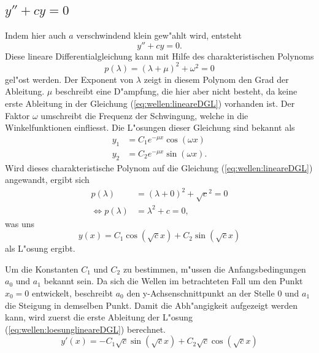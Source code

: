 \subsection{\texorpdfstring{$y''+cy = 0$}{y''+cy = 0}}
Indem hier auch $a$ verschwindend klein gew"ahlt wird, entsteht
\begin{equation}
	y''+ cy = 0.
	\label{eq:wellen:lineareDGL}
\end{equation}
Diese lineare Differentialgleichung kann mit Hilfe des charakteristischen 
Polynoms
\begin{equation*}
	p(\lambda) = (\lambda+\mu)^2+\omega^2 = 0
\end{equation*}
gel"ost werden. Der Exponent von $\lambda$ zeigt in diesem Polynom den Grad der 
Ableitung. $\mu$ beschreibt eine D"ampfung, die hier aber nicht besteht, da 
keine erste Ableitung in der Gleichung (\ref{eq:wellen:lineareDGL}) vorhanden 
ist. Der Faktor $\omega$ umschreibt die Frequenz der Schwingung, welche in die 
Winkelfunktionen einfliesst. Die L"osungen dieser Gleichung sind bekannt als
\begin{equation*}
	\begin{split}
		y_1 &= C_1e^{-\mu x}\cos(\omega x) \\
		y_2 &= C_2e^{-\mu x}\sin(\omega x).
	\end{split}
\end{equation*}
Wird dieses charakteristische Polynom auf die Gleichung 
(\ref{eq:wellen:lineareDGL}) angewandt, ergibt sich
\begin{equation*}
	\begin{split}
		p(\lambda) &= (\lambda+0)^2+\sqrt{c}^2 = 0 \\
		\Leftrightarrow p(\lambda) &= \lambda^2+c = 0,
	\end{split}
\end{equation*}
was uns
\begin{equation}
	y(x) = C_1 \cos(\sqrt{c}x) + C_2 \sin(\sqrt{c}x)
	\label{eq:wellen:loesunglineareDGL}
\end{equation}
als L"osung ergibt.

Um die Konstanten $C_1$ und $C_2$ zu bestimmen, m"ussen die Anfangsbedingungen 
$a_0$ und $a_1$ bekannt sein. Da sich die Wellen im betrachteten Fall um den 
Punkt $x_0=0$ entwickelt, beschreibt $a_0$ den y-Achsenschnittpunkt an 
der Stelle $0$ und $a_1$ die Steigung in demselben Punkt. Damit die 
Abh"angigkeit aufgezeigt werden kann, wird zuerst die erste Ableitung der 
L"osung (\ref{eq:wellen:loesunglineareDGL}) berechnet.
\begin{equation}
	y'(x)=-C_1 \sqrt{c} \sin(\sqrt{c}x) + C_2 \sqrt{c} \cos(\sqrt{c}x)
\end{equation}

